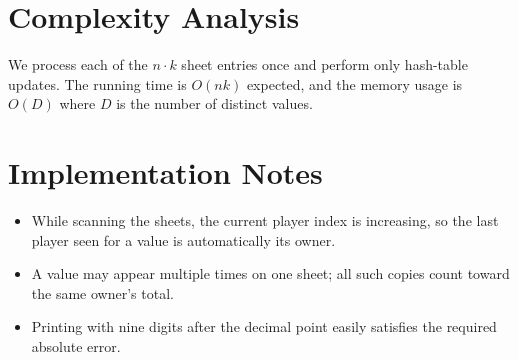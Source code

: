 \documentclass[11pt]{article}
\begin{document}
\section*{Complexity Analysis}

We process each of the $n \cdot k$ sheet entries once and perform only hash-table updates. The running
time is $O(nk)$ expected, and the memory usage is $O(D)$ where $D$ is the number of distinct values.

\section*{Implementation Notes}

\begin{itemize}[leftmargin=*]
    \item While scanning the sheets, the current player index is increasing, so the last player seen for a
    value is automatically its owner.
    \item A value may appear multiple times on one sheet; all such copies count toward the same owner's
    total.
    \item Printing with nine digits after the decimal point easily satisfies the required absolute error.
\end{itemize}
\end{document}
